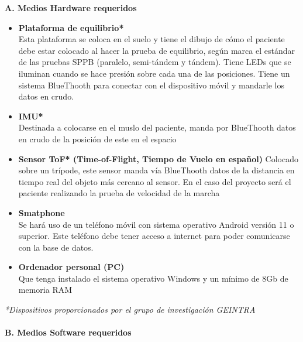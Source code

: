 \documentclass[12pt,oneside,a4paper]{article}
\begin{document}
\textbf{A. Medios Hardware requeridos}
\begin{itemize}
    
    \begin{itemize}
        \item \textbf{Plataforma de equilibrio*} \\
        Esta plataforma se coloca en el suelo y tiene el dibujo de cómo el paciente debe estar colocado al hacer la prueba de equilibrio, según marca el estándar de las pruebas SPPB (paralelo, semi-tándem y tándem). Tiene LEDs que se iluminan cuando se hace presión sobre cada una de las posiciones. Tiene un sistema BlueThooth para conectar con el dispositivo móvil y mandarle los datos en crudo.
        \item \textbf{IMU*} \\
        Destinada a colocarse en el muslo del paciente, manda por BlueThooth datos en crudo de la posición de este en el espacio
        \item \textbf{Sensor ToF* (Time-of-Flight, Tiempo de Vuelo en español)}
        Colocado sobre un trípode, este sensor manda vía BlueThooth datos de la distancia en tiempo real del objeto más cercano al sensor. En el caso del proyecto será el paciente realizando la prueba de velocidad de la marcha
        \item \textbf{Smatphone} \\
        Se hará uso de un teléfono móvil con sistema operativo Android versión 11 o superior. Este teléfono debe tener acceso a internet para poder comunicarse con la base de datos. \\
        \item \textbf{Ordenador personal (PC)} \\
        Que tenga instalado el sistema operativo Windows y un mínimo de 8Gb de memoria RAM
    \end{itemize}
    
\textit{*Dispositivos proporcionados por el grupo de investigación GEINTRA} \\
\\

\textbf{B. Medios Software requeridos}


\end{itemize}
\end{document}
